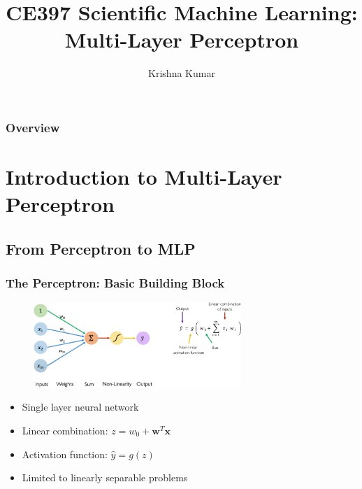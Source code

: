 \documentclass{beamer}
\title[CE397: Multi-Layer Perceptron]{CE397 Scientific Machine Learning: Multi-Layer Perceptron}
\author{Krishna Kumar} %
\institute[UT Austin] %
{
University of Texas at Austin \\
\medskip
\textit{
  \url{krishnak@utexas.edu}} %
}
\date{} %
\begin{document}
\begin{frame}
\titlepage %
\end{frame}

\begin{frame}
 \frametitle{Overview}
 \tableofcontents
\end{frame}


\section{Introduction to Multi-Layer Perceptron}

\subsection{From Perceptron to MLP}
\begin{frame}
\frametitle{The Perceptron: Basic Building Block}
\begin{figure}
\includegraphics[width=0.7\textwidth]{perceptron.png}
\end{figure}

\begin{itemize}
    \item Single layer neural network
    \item Linear combination: $z = w_0 + \boldsymbol{w}^T\boldsymbol{x}$
    \item Activation function: $\hat{y} = g(z)$
    \item Limited to linearly separable problems
\end{itemize}
\end{frame}
\end{document}

